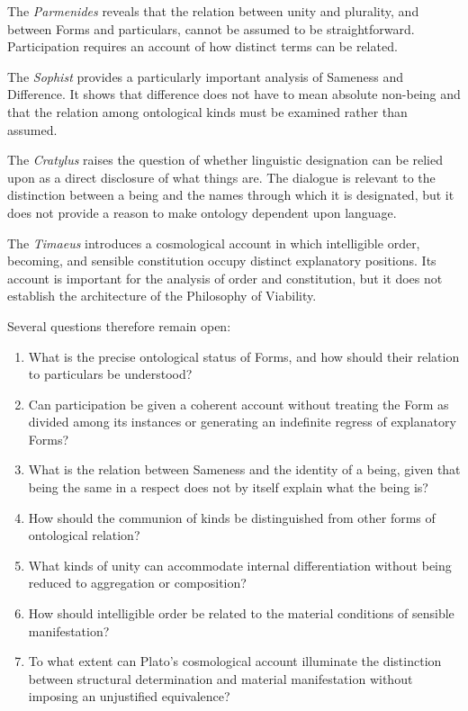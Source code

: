 The \textit{Parmenides} reveals that the relation between unity
and plurality, and between Forms and particulars, cannot be
assumed to be straightforward. Participation requires an
account of how distinct terms can be related.

The \textit{Sophist} provides a particularly important analysis
of Sameness and Difference. It shows that difference does not
have to mean absolute non-being and that the relation among
ontological kinds must be examined rather than assumed.

The \textit{Cratylus} raises the question of whether linguistic
designation can be relied upon as a direct disclosure of what
things are. The dialogue is relevant to the distinction between
a being and the names through which it is designated, but it
does not provide a reason to make ontology dependent upon
language.

The \textit{Timaeus} introduces a cosmological account in which
intelligible order, becoming, and sensible constitution occupy
distinct explanatory positions. Its account is important for
the analysis of order and constitution, but it does not
establish the architecture of the Philosophy of Viability.

Several questions therefore remain open:

\begin{enumerate}
    \item What is the precise ontological status of Forms, and
    how should their relation to particulars be understood?
    \item Can participation be given a coherent account without
    treating the Form as divided among its instances or
    generating an indefinite regress of explanatory Forms?
    \item What is the relation between Sameness and the identity
    of a being, given that being the same in a respect does
    not by itself explain what the being is?
    \item How should the communion of kinds be distinguished
    from other forms of ontological relation?
    \item What kinds of unity can accommodate internal
    differentiation without being reduced to aggregation
    or composition?
    \item How should intelligible order be related to the
    material conditions of sensible manifestation?
    \item To what extent can Plato's cosmological account
    illuminate the distinction between structural
    determination and material manifestation without
    imposing an unjustified equivalence?
\end{enumerate}


